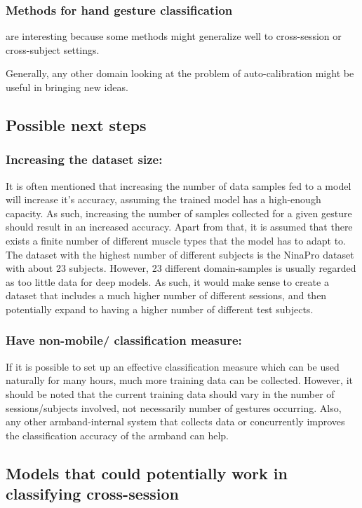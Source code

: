 \documentclass{article}
\begin{document}
\subsubsection{Methods for hand gesture classification} are interesting because some methods might generalize well to cross-session or cross-subject settings.

Generally, any other domain looking at the problem of auto-calibration might be useful in bringing new ideas.

\subsection{Possible next steps} 

\subsubsection{Increasing the dataset size:} It is often mentioned that increasing the number of data samples fed to a model will increase it's accuracy, assuming the trained model has a high-enough capacity. As such, increasing the number of samples collected for a given gesture should result in an increased accuracy. Apart from that, it is assumed that there exists a finite number of different muscle types that the model has to adapt to. The dataset with the highest number of different subjects is the NinaPro dataset with about 23 subjects. However, 23 different domain-samples is usually regarded as too little data for deep models. As such, it would make sense to create a dataset that includes a much higher number of different sessions, and then potentially expand to having a higher number of different test subjects.
\subsubsection{Have non-mobile/ classification measure:} If it is possible to set up an effective classification measure which can be used naturally for many hours, much more training data can be collected. However, it should be noted that the current training data should vary in the number of sessions/subjects involved, not necessarily number of gestures occurring. Also, any other armband-internal system that collects data or concurrently improves the classification accuracy of the armband can help.

\subsection{Models that could potentially work in classifying cross-session}
\end{document}
